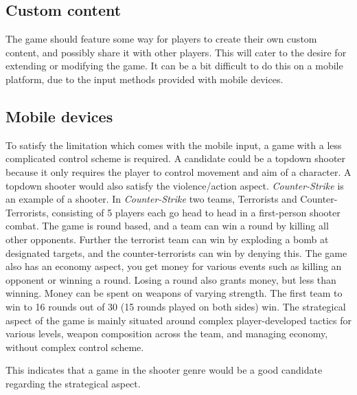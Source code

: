 \subsection{Custom content}
The game should feature some way for players to create their own custom content, and possibly share it with other players.
This will cater to the desire for extending or modifying the game.
It can be a bit difficult to do this on a mobile platform, due to the input methods provided with mobile devices.

\subsection{Mobile devices}\label{sec:selectionofgametype:mobiledevices}
To satisfy the limitation which comes with the mobile input, a game with a less complicated control scheme is required.
A candidate could be a topdown shooter because it only requires the player to control movement and aim of a character. A topdown shooter would also satisfy the violence/action aspect.
\textit{Counter-Strike} is an example of a shooter. \cite{counterstrike}
In \textit{Counter-Strike} two teams, Terrorists and Counter-Terrorists, consisting of 5 players each go head to head in a first-person shooter combat. 
The game is round based, and a team can win a round by killing all other opponents. 
Further the terrorist team can win by exploding a bomb at designated targets, and the counter-terrorists can win by denying this. 
The game also has an economy aspect, you get money for various events such as killing an opponent or winning a round.
Losing a round also grants money, but less than winning.
Money can be spent on weapons of varying strength.
The first team to win to 16 rounds out of 30 (15 rounds played on both sides) win. 
The strategical aspect of the game is mainly situated around complex player-developed tactics for various levels, weapon composition across the team, and managing economy, without complex control scheme.

This indicates that a game in the shooter genre would be a good candidate regarding the strategical aspect.


